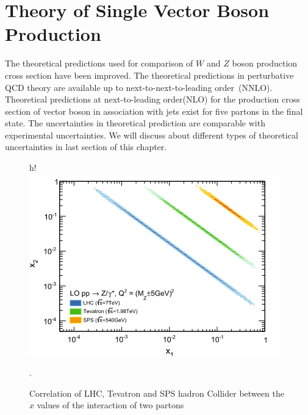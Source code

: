 \section{Theory of Single Vector Boson Production}
The theoretical predictions used for comparison of $W$ and $Z$ boson production cross section have been improved. The theoretical predictions in perturbative QCD theory are available up to next-to-next-to-leading order~(NNLO). Theoretical predictions at next-to-leading order(NLO) for the production cross section of vector boson in association with jets exist for five partons in the final state. The uncertainties in  theoretical prediction  are comparable with experimental uncertainties. We will discuss about different types of theoretical uncertainties in last section of this chapter.
\begin{figure}{h!}
\includegraphics[scale=1]{chapter3/bjorkenx.png}
\caption{Correlation of LHC, Tevatron and SPS hadron Collider between the $x$ values of the interaction of two partons~\cite{Schott_2014}}.
\label{fig1}
\end{figure}
 
